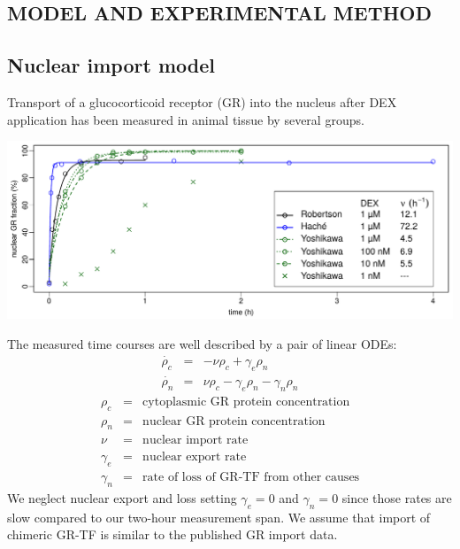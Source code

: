 \documentclass[aspb,landscape]{a0poster}
\newlength{\figwidth}
\newlength{\figtopspace}
\begin{document}
\begin{multicols}{3}
  \section*{MODEL AND EXPERIMENTAL METHOD}



  \subsection*{Nuclear import model}

  Transport of a glucocorticoid receptor (GR) into the nucleus after DEX application has been measured in animal tissue by several groups.

  \begin{center}\vspace{\figtopspace}
    \includegraphics[width=\figwidth]{robertson-hache-yoshikawa}
  \end{center}
  
  The measured time courses are well described by a pair of linear ODEs:
  \begin{eqnarray*}\label{eq:rho_c_de}
    \dot{\rho_c} &=& -\nu \rho_c + \gamma_e \rho_n \\
    \dot{\rho_n} &=&  \nu \rho_c - \gamma_e \rho_n - \gamma_n \rho_n
  \end{eqnarray*}
  \begin{eqnarray*}
    \rho_c &=& \text{cytoplasmic GR protein concentration} \\
    \rho_n &=& \text{nuclear GR protein concentration} \\
    \nu &=& \text{nuclear import rate} \\
    \gamma_e &=& \text{nuclear export rate} \\
    \gamma_n &=& \text{rate of loss of GR-TF from other causes}
  \end{eqnarray*}
  We neglect nuclear export and loss setting $\gamma_e=0$ and $\gamma_n=0$ since those rates are slow compared to our two-hour measurement span.
  We assume that import of chimeric GR-TF is similar to the published GR import data.


\end{multicols}
\end{document}
